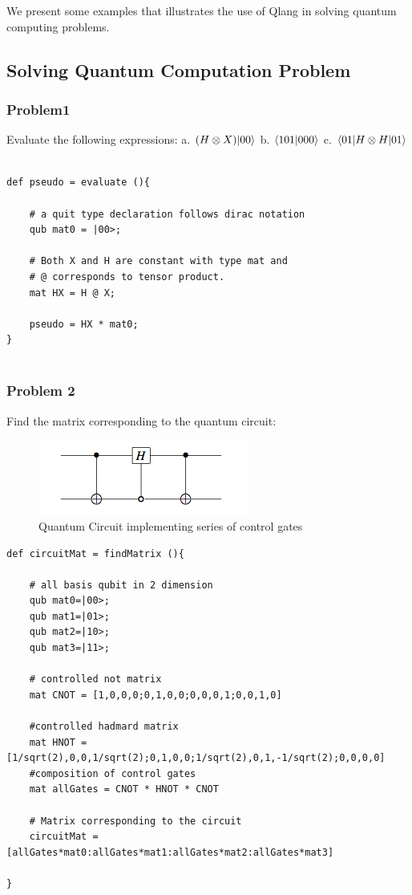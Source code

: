 We present some examples that illustrates the use of Qlang in solving quantum computing problems.

\subsection { Solving Quantum Computation Problem}
\subsubsection{Problem1}
Evaluate the following expressions: a. $(H \otimes X) |00\rangle$ b. $\dotproduct[101,000]$ c. $\langle 01| H \otimes H |01\rangle $
\begin{lstlisting}
	
def pseudo = evaluate (){
		
	# a quit type declaration follows dirac notation
	qub mat0 = |00>;
		
	# Both X and H are constant with type mat and
	# @ corresponds to tensor product.
	mat HX = H @ X;
		
	pseudo = HX * mat0;
}
	
\end{lstlisting}

\subsubsection{Problem 2}
Find the matrix corresponding to the quantum circuit:
\begin{figure}[h!]
\begin{center}
\includegraphics{circuit1}
\end{center}
\caption{ Quantum Circuit implementing series of control gates
\label{cir1}}
\end{figure}

\begin{lstlisting}
def circuitMat = findMatrix (){
	
	# all basis qubit in 2 dimension
	qub mat0=|00>;
	qub mat1=|01>;
	qub mat2=|10>;
	qub mat3=|11>;
	
	# controlled not matrix	
	mat CNOT = [1,0,0,0;0,1,0,0;0,0,0,1;0,0,1,0]
	
	#controlled hadmard matrix
	mat HNOT = [1/sqrt(2),0,0,1/sqrt(2);0,1,0,0;1/sqrt(2),0,1,-1/sqrt(2);0,0,0,0]
	#composition of control gates
	mat allGates = CNOT * HNOT * CNOT
	
	# Matrix corresponding to the circuit	
	circuitMat =[allGates*mat0:allGates*mat1:allGates*mat2:allGates*mat3]
		
}
\end{lstlisting}
